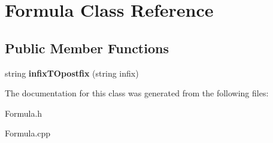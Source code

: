 \hypertarget{classFormula}{}\section{Formula Class Reference}
\label{classFormula}
\subsection*{Public Member Functions}
\begin{DoxyCompactItemize}
\item 
\mbox{\label{classFormula_a906575b4a0a3495974c6ca3523587b86}} 
string {\bfseries infix\+T\+Opostfix} (string infix)
\end{DoxyCompactItemize}


The documentation for this class was generated from the following files\+:\begin{DoxyCompactItemize}
\item 
Formula.\+h\item 
Formula.\+cpp\end{DoxyCompactItemize}
